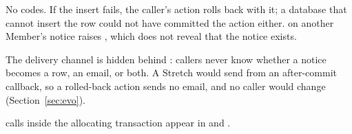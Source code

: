 No  codes. If the insert fails, the caller's action rolls back with it; a database that cannot insert the row could not have committed the action either.  on another Member's notice raises , which does not reveal that the notice exists.

The delivery channel is hidden behind : callers never know whether a notice becomes a row, an email, or both. A Stretch  would send from an after-commit callback, so a rolled-back action sends no email, and no caller would change (Section~\ref{sec:evo}).

 calls inside the allocating transaction appear in  and .
